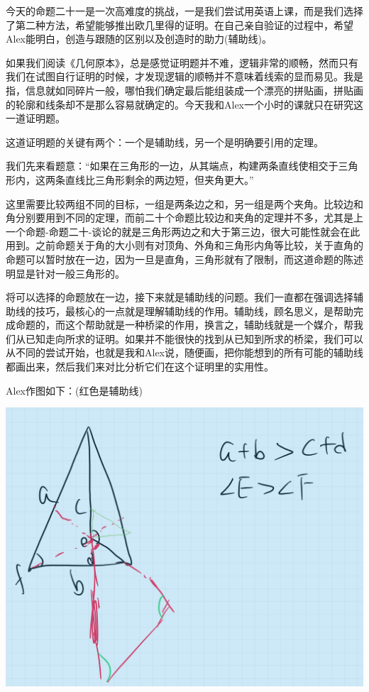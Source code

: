 \documentclass[
]{book}
\begin{document}
今天的命题二十一是一次高难度的挑战，一是我们尝试用英语上课，而是我们选择了第二种方法，希望能够推出欧几里得的证明。在自己亲自验证的过程中，希望Alex能明白，创造与跟随的区别以及创造时的助力(辅助线)。

如果我们阅读《几何原本》，总是感觉证明题并不难，逻辑非常的顺畅，然而只有我们在试图自行证明的时候，才发现逻辑的顺畅并不意味着线索的显而易见。我是指，信息就如同碎片一般，哪怕我们确定最后能组装成一个漂亮的拼贴画，拼贴画的轮廓和线条却不是那么容易就确定的。今天我和Alex一个小时的课就只在研究这一道证明题。

这道证明题的关键有两个：一个是辅助线，另一个是明确要引用的定理。

我们先来看题意：``如果在三角形的一边，从其端点，构建两条直线使相交于三角形内，这两条直线比三角形剩余的两边短，但夹角更大。''

这里需要比较两组不同的目标，一组是两条边之和，另一组是两个夹角。比较边和角分别要用到不同的定理，而前二十个命题比较边和夹角的定理并不多，尤其是上一个命题-命题二十-谈论的就是三角形两边之和大于第三边，很大可能性就会在此用到。之前命题关于角的大小则有对顶角、外角和三角形内角等比较，关于直角的命题可以暂时放在一边，因为一旦是直角，三角形就有了限制，而这道命题的陈述明显是针对一般三角形的。

将可以选择的命题放在一边，接下来就是辅助线的问题。我们一直都在强调选择辅助线的技巧，最核心的一点就是理解辅助线的作用。辅助线，顾名思义，是帮助完成命题的，而这个帮助就是一种桥梁的作用，换言之，辅助线就是一个媒介，帮我们从已知走向所求的证明。如果并不能很快的找到从已知到所求的桥梁，我们可以从不同的尝试开始，也就是我和Alex说，随便画，把你能想到的所有可能的辅助线都画出来，然后我们来对比分析它们在这个证明里的实用性。

Alex作图如下：(红色是辅助线)

\includegraphics[width=1\linewidth]{./image/11-prop21-image10}
\end{document}

